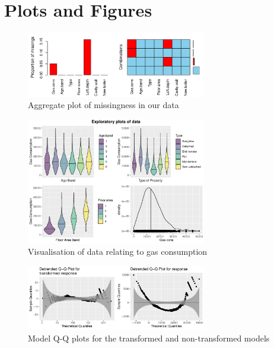\documentclass[9pt]{extarticle}
\begin{document}
\section{Plots and Figures}

\begin{figure}[H]
	\centering
	\includegraphics[width=0.7\textwidth]{aggr_missplot}
	\caption{Aggregate plot of missingness in our data}
	\label{fig:aggrmiss}
\end{figure}

\begin{figure}[H]
	\centering
	\includegraphics[width=0.7\textwidth]{datavis}
	\caption{Visualisation of data relating to gas consumption}
	\label{fig:datavis}
\end{figure}


\begin{figure}[H]
	\centering
	\includegraphics[width=0.7\textwidth]{qqplots}
	\caption{Model Q-Q plots for the transformed and non-transformed models}
	\label{fig:qqplots}
\end{figure}
\end{document}
